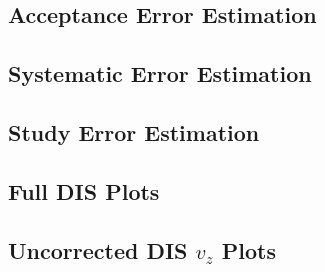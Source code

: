 \subsection*{Acceptance Error Estimation}


\subsection*{Systematic Error Estimation}


\subsection*{Study Error Estimation}


\subsection*{Full DIS Plots}


\subsection*{Uncorrected DIS $v_z$ Plots}

